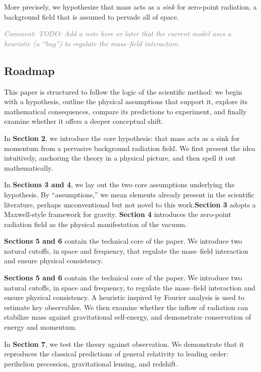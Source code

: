\documentclass {article}
\newcommand{\comment}[1]{\textcolor{gray}{\small\textit{Comment: #1}}}
\begin{document}
More precisely, we hypothesize that mass acts as a \emph{sink} for zero-point radiation, a background field that is assumed to pervade all of space.

\comment{TODO: Add a note here or later that the current model uses a heuristic (a “bug”) to regulate the mass–field interaction.}



\subsection{Roadmap}

This paper is structured to follow the logic of the scientific method: we begin with a hypothesis, outline the physical assumptions that support it, explore its mathematical consequences, compare its predictions to experiment, and finally examine whether it offers a deeper conceptual shift.

In \textbf{Section 2}, we introduce the core hypothesis: that mass acts as a sink for momentum from a pervasive background radiation field. We first present the idea intuitively, anchoring the theory in a physical picture, and then spell it out mathematically.

In \textbf{Sections 3 and 4}, we lay out the two core assumptions underlying the hypothesis. By “assumptions,” we mean elements already present in the scientific literature, perhaps unconventional but not novel to this work.\textbf{Section 3} adopts a Maxwell-style framework for gravity. \textbf{Section 4} introduces the zero-point radiation field as the physical manifestation of the vacuum.

\textbf{Sections 5 and 6} contain the technical core of the paper. We introduce two natural cutoffs, in space and frequency, that regulate the mass–field interaction and ensure physical consistency. 

\textbf{Sections 5 and 6} contain the technical core of the paper. We introduce two natural cutoffs, in space and frequency, to regulate the mass–field interaction and ensure physical consistency. A heuristic inspired by Fourier analysis is used to estimate key observables. We then examine whether the inflow of radiation can stabilize mass against gravitational self-energy, and demonstrate conservation of energy and momentum.

In \textbf{Section 7}, we test the theory against observation. We demonstrate that it reproduces the classical predictions of general relativity to leading order: perihelion precession, gravitational lensing, and redshift.
\end{document}
